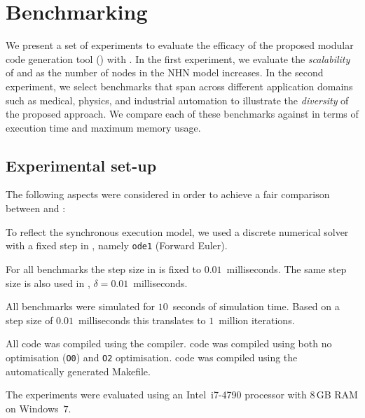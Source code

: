 \section{Benchmarking}
\label{sec:benchmarking}


We present a set of experiments to evaluate the efficacy of the proposed
modular code generation tool (\ourTool) with \simulink.  In the first 
experiment, we evaluate the \emph{scalability} of \ourTool and \simulink as the 
number of nodes in the \ac{NHN} model increases.  In the second experiment, we 
select benchmarks that span across different application domains such as 
medical, physics, and industrial automation to illustrate the \emph{diversity} 
of the proposed approach.  We compare each of these benchmarks against 
\simulink in terms of execution time and maximum memory usage.  


\subsection{Experimental set-up}
\label{sec:experimentalSetUp}
The following aspects were considered in order to achieve a fair
comparison between \ourTool and \simulink:

\begin{description}
\item[\textbf{Solver}] To reflect the synchronous execution model, we
  used a discrete numerical solver with a fixed step in \simulink,
  namely \texttt{ode1} (Forward Euler).
  
\item[\textbf{Step Size}] For all benchmarks the step size in \simulink
  is fixed to $0.01$~milliseconds.  The same step size is also used in
  \ourTool, $\delta = 0.01$~milliseconds.
  
\item[\textbf{Time}] All benchmarks were simulated for $10$~seconds of
  simulation time.  Based on a step size of $0.01$~milliseconds this
  translates to $1$~million iterations.
  
\item[\textbf{Compiler}] All code was compiled using the \compiler
  compiler.  \ourTool code was compiled using both no optimisation
  (\texttt{O0}) and \texttt{O2} optimisation.  \simulink code was
  compiled using the automatically generated Makefile.
\end{description}

The experiments were evaluated using an Intel~i7-4790 processor with
$8$\,GB RAM on Windows~$7$.


